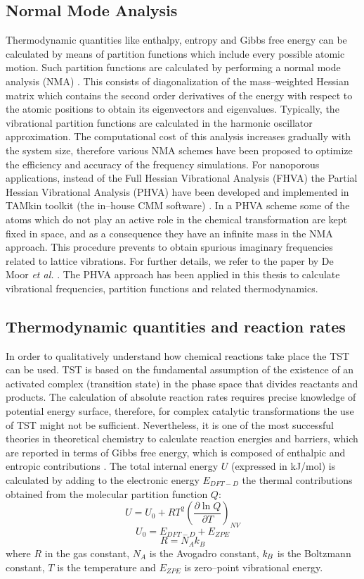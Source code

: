 \subsection*{Normal Mode Analysis}
Thermodynamic quantities like enthalpy, entropy and Gibbs free energy can be
calculated by means of partition functions which include every possible atomic
motion. Such partition functions are calculated by performing a normal mode
analysis (NMA) \cite{Frenkel2002}. This consists of diagonalization of the
mass--weighted Hessian matrix which contains the second order derivatives of the
energy with respect to the atomic positions to obtain its eigenvectors and
eigenvalues.
Typically, the vibrational partition functions are calculated in the harmonic oscillator
approximation. The computational cost of this
analysis increases gradually with the system size, therefore various NMA schemes
have been proposed to optimize the efficiency and accuracy of the frequency
simulations. For nanoporous applications, instead of the Full Hessian
Vibrational Analysis (FHVA) the Partial Hessian Vibrational
Analysis (PHVA) have been developed and implemented in
TAMkin toolkit (the in--house CMM software) \cite{DeMoor2011, Ghysels2010}. In a
PHVA scheme some of the atoms which do not play an active role in the chemical transformation are kept fixed
in space, and as a consequence they have an infinite mass in the NMA approach.
This procedure prevents to obtain spurious imaginary frequencies related to
lattice vibrations. For further details, we refer to the paper by De Moor
\textit{et al.} \cite{DeMoor2011}. The PHVA approach has been applied in this
thesis to calculate vibrational frequencies, partition functions and related thermodynamics.


\subsection*{Thermodynamic quantities and reaction rates}
In order to qualitatively understand how chemical reactions take place the
TST can be used. TST is based on the fundamental
assumption of the existence of an activated complex (transition state) in the phase space that
divides reactants and products. The calculation of
absolute reaction rates requires precise knowledge of potential energy surface,
therefore, for complex catalytic transformations the use of TST might not be
sufficient. Nevertheless, it is one of the
most successful theories in theoretical chemistry to calculate reaction energies and barriers, which are reported in terms of Gibbs free
energy, which is composed of enthalpic and entropic
contributions \cite{Eyring1935}. The total internal energy $U$ (expressed in
kJ/mol) is calculated by adding to the electronic energy $E_{DFT-D}$ the thermal
contributions obtained from the molecular partition function $Q$:
\[
U = U_{0} + R T^{2}\left(\frac{\partial \ln Q}{\partial T}\right)_{NV}
\]
\[ U_{0} = E_{DFT-D} + E_{ZPE} \]
\[ R = N_{A} k_B \]
where $R$ in the gas constant, $N_{A}$ is the Avogadro constant, $\it{k}_{B}$ is
the Boltzmann constant, $T$ is the temperature and $E_{ZPE}$ is zero--point
vibrational energy.\\

